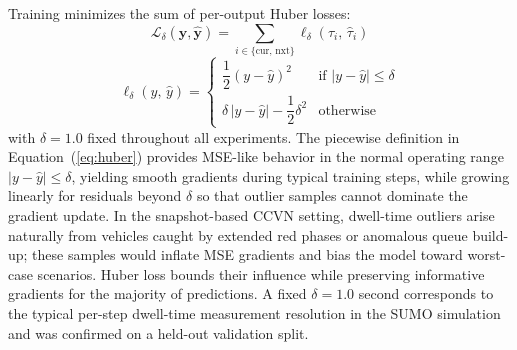 \documentclass[journal]{IEEEtran}
\begin{document}
Training minimizes the sum of per-output Huber losses:
\begin{equation}
\mathcal{L}_\delta(\mathbf{y}, \hat{\mathbf{y}}) = \sum_{i \in \{\text{cur},\,\text{nxt}\}} \ell_\delta(\tau_i,\, \hat{\tau}_i)
\label{eq:total_loss}
\end{equation}
\begin{equation}
\ell_\delta(y,\, \hat{y}) =
\begin{cases}
\dfrac{1}{2}(y - \hat{y})^2 & \text{if } |y - \hat{y}| \le \delta \\[6pt]
\delta\,|y - \hat{y}| - \dfrac{1}{2}\delta^2 & \text{otherwise}
\end{cases}
\label{eq:huber}
\end{equation}
with $\delta = 1.0$ fixed throughout all experiments.
The piecewise definition in Equation~(\ref{eq:huber}) provides MSE-like behavior in the normal operating range $|y - \hat{y}| \le \delta$, yielding smooth gradients during typical training steps, while growing linearly for residuals beyond $\delta$ so that outlier samples cannot dominate the gradient update.
In the snapshot-based CCVN setting, dwell-time outliers arise naturally from vehicles caught by extended red phases or anomalous queue build-up; these samples would inflate MSE gradients and bias the model toward worst-case scenarios.
Huber loss bounds their influence while preserving informative gradients for the majority of predictions.
A fixed $\delta = 1.0$ second corresponds to the typical per-step dwell-time measurement resolution in the SUMO simulation and was confirmed on a held-out validation split.

\end{document}
